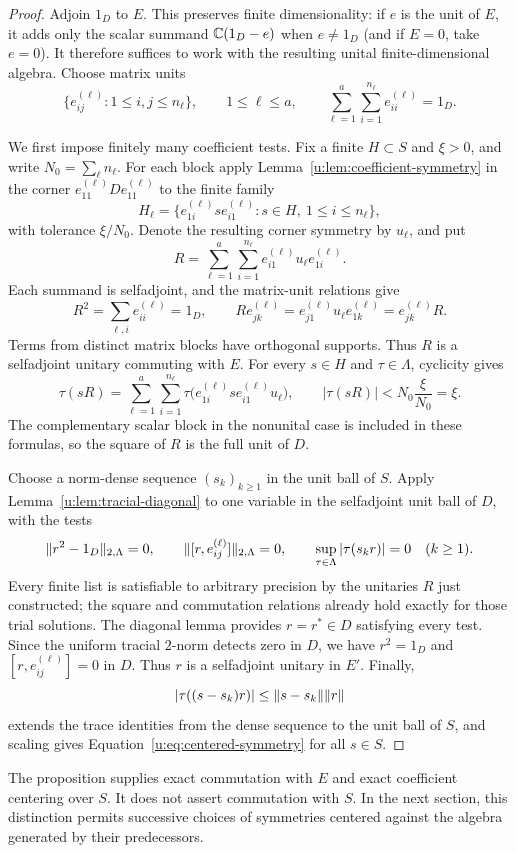 \begin{proof}
Adjoin $1_D$ to $E$.  This preserves finite dimensionality: if $e$ is
the unit of $E$, it adds only the scalar summand $\mathbb C(1_D-e)$ when
$e\ne1_D$ (and if $E=0$, take $e=0$).  It therefore suffices to work
with the resulting unital finite-dimensional algebra.  Choose matrix
units
\[
 \{e^{(\ell)}_{ij}:1\le i,j\le n_\ell\},\qquad
 1\le\ell\le a,
 \qquad
 \sum_{\ell=1}^a\sum_{i=1}^{n_\ell}e^{(\ell)}_{ii}=1_D.
\]

We first impose finitely many coefficient tests.  Fix a finite
$H\subset S$ and $\xi>0$, and write $N_0=\sum_\ell n_\ell$.
For each block apply Lemma~\ref{u:lem:coefficient-symmetry} in the corner
$e^{(\ell)}_{11}De^{(\ell)}_{11}$ to the finite family
\[
 H_\ell=
 \{e^{(\ell)}_{1i}s e^{(\ell)}_{i1}:
                    s\in H,\ 1\le i\le n_\ell\},
\]
with tolerance $\xi/N_0$.  Denote the resulting corner symmetry by
$u_\ell$, and put
\[
 R=\sum_{\ell=1}^a\sum_{i=1}^{n_\ell}
       e^{(\ell)}_{i1}u_\ell e^{(\ell)}_{1i}.
\]
Each summand is selfadjoint, and the matrix-unit relations give
\[
 R^2=\sum_{\ell,i}e^{(\ell)}_{ii}=1_D,
 \qquad
 Re^{(\ell)}_{jk}
   =e^{(\ell)}_{j1}u_\ell e^{(\ell)}_{1k}
   =e^{(\ell)}_{jk}R.
\]
Terms from distinct matrix blocks have orthogonal supports.  Thus $R$
is a selfadjoint unitary commuting with $E$.  For every $s\in H$ and
$\tau\in\Lambda$, cyclicity gives
\[
 \tau(sR)=\sum_{\ell=1}^a\sum_{i=1}^{n_\ell}
       \tau\bigl(e^{(\ell)}_{1i}s e^{(\ell)}_{i1}u_\ell\bigr),
 \qquad
 |\tau(sR)|<N_0\frac{\xi}{N_0}=\xi.
\]
The complementary scalar block in the nonunital case is included in
these formulas, so the square of $R$ is the full unit of $D$.

Choose a norm-dense sequence $(s_k)_{k\ge1}$ in the unit ball of $S$.
Apply Lemma~\ref{u:lem:tracial-diagonal} to one variable in the
selfadjoint unit ball of $D$, with the tests
\[
 \lVert r^2-1_D\rVert_{2,\Lambda}=0,
 \qquad
 \lVert[r,e^{(\ell)}_{ij}]\rVert_{2,\Lambda}=0,
 \qquad
 \sup_{\tau\in\Lambda}|\tau(s_kr)|=0\quad(k\ge1).
\]
Every finite list is satisfiable to arbitrary precision by the
unitaries $R$ just constructed; the square and commutation relations
already hold exactly for those trial solutions.  The diagonal lemma
provides $r=r^*\in D$ satisfying every test.  Since the uniform
tracial $2$-norm detects zero in $D$, we have $r^2=1_D$ and
$[r,e^{(\ell)}_{ij}]=0$ in $D$.  Thus $r$ is a selfadjoint unitary in
$E'$.  Finally,
\[
 |\tau((s-s_k)r)|\le\lVert s-s_k\rVert\lVert r\rVert
\]
extends the trace identities from the dense sequence to the unit ball
of $S$, and scaling gives Equation~\eqref{u:eq:centered-symmetry} for
all $s\in S$.
\end{proof}

The proposition supplies exact commutation with $E$ and exact
coefficient centering over $S$.  It does not assert commutation with
$S$.  In the next section, this distinction permits successive choices
of symmetries centered against the algebra generated by their
predecessors.
